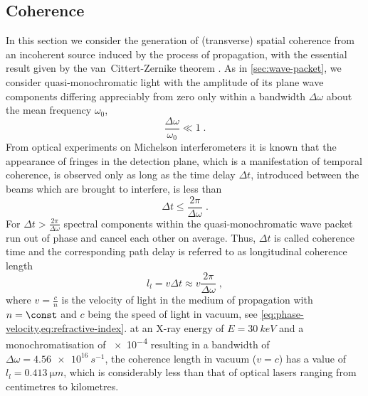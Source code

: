\documentclass[
twoside,
openright,
titlepage,
numbers=noenddot,
headinclude,
fleqn,
a4paper,
footinclude=true,
cleardoublepage=empty,
abstractoff,
BCOR=5mm,
paper=a4,
fontsize=11pt,
british,ngerman,american,
]{scrreprt}
\begin{document}
\subsection{Coherence}
\label{sec:coherence}

In this section we consider the generation of (transverse) spatial
coherence from an incoherent source induced by the process of
propagation, with the essential result given by the van~Cittert-Zernike
theorem \cite{Wolf,BornWolf}.  As in \cref{sec:wave-packet}, we
consider quasi-monochromatic light with the amplitude of its plane
wave components differing appreciably from zero only within a
bandwidth $\Delta\omega$ about the mean frequency $\omega_0$,
\begin{equation}
  \label{eq:quasimono-2}
  \frac{\Delta\omega}{\omega_0}\ll 1 \;.
\end{equation}
From optical experiments on Michelson interferometers \cite{Wolf} it
is known that the appearance of fringes in the detection plane, which
is a manifestation of temporal coherence, is observed only as long as
the time delay $\Delta t$, introduced between the beams which are
brought to interfere, is less than
\begin{equation}
  \label{eq:coherence-time}
  \Delta t \le \frac{2\pi}{\Delta\omega} \;.
\end{equation}
For $\Delta t>\frac{2\pi}{\Delta\omega}$ spectral components within
the quasi-monochromatic wave packet run out of phase and cancel each
other on average.  Thus, $\Delta t$ is called coherence time and the
corresponding path delay is referred to as longitudinal coherence
length
\begin{equation}
   \label{eq:coherence-length-longitudinal}
   l_l = v \Delta t \approx v \frac{2\pi}{\Delta\omega} \;,
\end{equation}
where $v=\frac{c}{n}$ is the velocity of light in the medium of
propagation with $n=\const$ and $c$ being the speed of light in
vacuum, see \cref{eq:phase-velocity,eq:refractive-index}.  \Eg{} at an
X-ray energy of $E=\SI{30}{keV}$ and a monochromatisation of \num{e-4}
resulting in a bandwidth of $\Delta\omega=\SI{4.56e16}{s^{-1}}$, the
coherence length in vacuum ($v=c$) has a value of $l_l
=\SI{0.413}{\micro m}$, which is \eg{} considerably less than that of
optical lasers ranging from centimetres to kilometres.
\end{document}
